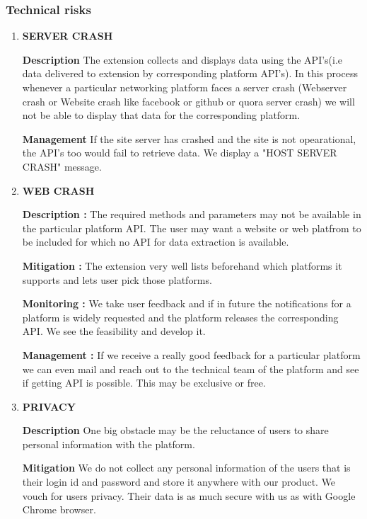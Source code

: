 \documentclass[12pt]{article}
\begin{document}
\subsubsection{Technical risks}
\begin{enumerate}
\item
\textbf{SERVER CRASH}

\bigskip
\textbf{Description}
The extension collects and displays data using the API's(i.e data delivered to extension by corresponding platform API's). In this process whenever a particular networking platform faces a server crash (Webserver crash or Website crash like facebook or github or quora server crash) we will not be able to display that data for the corresponding platform.

\bigskip
\textbf{Management}
If the site server has crashed and the site is not opearational, the API's too would fail to retrieve data. We display a "HOST SERVER CRASH" message.

\item
\textbf{WEB CRASH}

\bigskip
\textbf{Description :}
The required methods and parameters may not be available in the particular platform API. The user may want a website or web platfrom to be included for which no API for data extraction is available.

\bigskip
\textbf{Mitigation :}
The extension very well lists beforehand which platforms it supports and lets user pick those platforms.

\bigskip
\textbf{Monitoring :}
We take user feedback and if in future the notifications for a platform is widely requested and the platform releases the corresponding API. We see the feasibility and develop it.   

\bigskip
\textbf{Management :}
If we receive a really good feedback for a particular  platform we can even mail and reach out to the technical team of the platform and see if getting API is possible. This may  be exclusive or free.

\item
\textbf{PRIVACY}

\bigskip
\textbf{Description}
One big obstacle may be the reluctance of users to share personal information with the platform. 

\bigskip
\textbf{Mitigation}
We do not collect any personal information of the users that is their login id and password and store it anywhere with our product.
We vouch for users privacy. Their data is as much secure with us as  with Google Chrome browser.


\end{enumerate}
\end{document}
